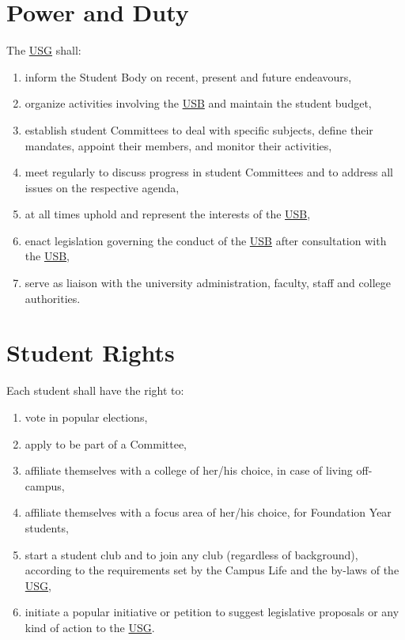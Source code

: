 \section{Power and Duty}
The \hyperref[USGdef]{USG} shall: 
\begin{enumerate}
\item inform the Student Body on recent, present and future endeavours,
\item organize activities involving the \hyperref[studentbody]{USB} and maintain the student budget,
\item establish student Committees to deal with specific subjects, define their mandates, appoint their members, and monitor their activities,
\item meet regularly to discuss progress in student Committees and to address all issues on the respective agenda,
\item at all times uphold and represent the interests of the \hyperref[studentbody]{USB},
\item enact legislation governing the conduct of the \hyperref[studentbody]{USB} after consultation with the \hyperref[studentbody]{USB},
\item serve as liaison with the university administration, faculty, staff and college authorities.
\end{enumerate}

\section{Student Rights}
Each student shall have the right to:
\begin{enumerate}[nosep] 
\item
vote in popular elections,


\item
apply to be part of a Committee,

\item
affiliate themselves with a college of her/his choice, in case of living off-campus,

\item 
affiliate themselves with a focus area of her/his choice, for Foundation Year students,

\item
start a student club and to join any club (regardless of background), according to the requirements set by the Campus Life and the by-laws of the \hyperref[USGdef]{USG},

\item
initiate a popular initiative or petition to suggest legislative proposals or any kind of action to the \hyperref[USGdef]{USG}.
\end{enumerate}

